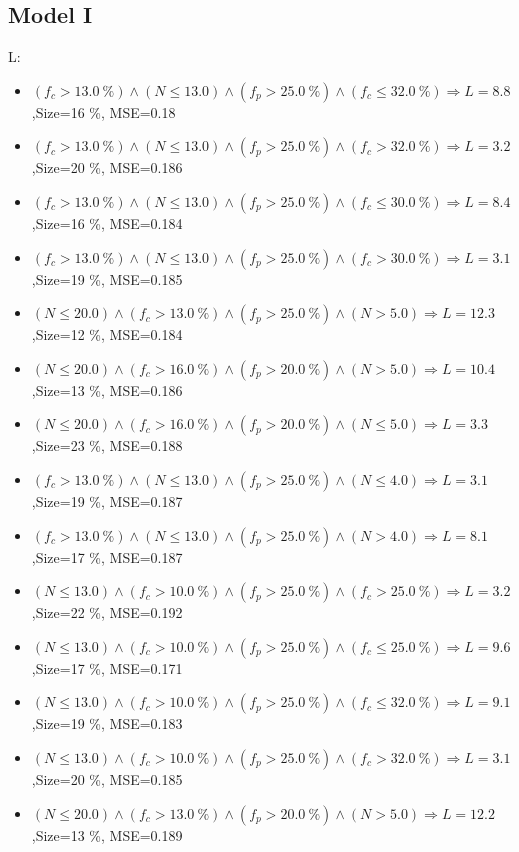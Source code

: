 \documentclass[numbered]{CSL}
\begin{document}
\subsection{Model I}
L:
\begin{itemize}
\item $(f_c > 13.0~\%) \land (N \leq 13.0) \land (f_p > 25.0~\%) \land (f_c \leq 32.0~\%) \Rightarrow L = 8.8$,\hfill Size=16 \%, MSE=0.18
\item $(f_c > 13.0~\%) \land (N \leq 13.0) \land (f_p > 25.0~\%) \land (f_c > 32.0~\%) \Rightarrow L = 3.2$,\hfill Size=20 \%, MSE=0.186
\item $(f_c > 13.0~\%) \land (N \leq 13.0) \land (f_p > 25.0~\%) \land (f_c \leq 30.0~\%) \Rightarrow L = 8.4$,\hfill Size=16 \%, MSE=0.184
\item $(f_c > 13.0~\%) \land (N \leq 13.0) \land (f_p > 25.0~\%) \land (f_c > 30.0~\%) \Rightarrow L = 3.1$,\hfill Size=19 \%, MSE=0.185
\item $(N \leq 20.0) \land (f_c > 13.0~\%) \land (f_p > 25.0~\%) \land (N > 5.0) \Rightarrow L = 12.3$,\hfill Size=12 \%, MSE=0.184
\item $(N \leq 20.0) \land (f_c > 16.0~\%) \land (f_p > 20.0~\%) \land (N > 5.0) \Rightarrow L = 10.4$,\hfill Size=13 \%, MSE=0.186
\item $(N \leq 20.0) \land (f_c > 16.0~\%) \land (f_p > 20.0~\%) \land (N \leq 5.0) \Rightarrow L = 3.3$,\hfill Size=23 \%, MSE=0.188
\item $(f_c > 13.0~\%) \land (N \leq 13.0) \land (f_p > 25.0~\%) \land (N \leq 4.0) \Rightarrow L = 3.1$,\hfill Size=19 \%, MSE=0.187
\item $(f_c > 13.0~\%) \land (N \leq 13.0) \land (f_p > 25.0~\%) \land (N > 4.0) \Rightarrow L = 8.1$,\hfill Size=17 \%, MSE=0.187
\item $(N \leq 13.0) \land (f_c > 10.0~\%) \land (f_p > 25.0~\%) \land (f_c > 25.0~\%) \Rightarrow L = 3.2$,\hfill Size=22 \%, MSE=0.192
\item $(N \leq 13.0) \land (f_c > 10.0~\%) \land (f_p > 25.0~\%) \land (f_c \leq 25.0~\%) \Rightarrow L = 9.6$,\hfill Size=17 \%, MSE=0.171
\item $(N \leq 13.0) \land (f_c > 10.0~\%) \land (f_p > 25.0~\%) \land (f_c \leq 32.0~\%) \Rightarrow L = 9.1$,\hfill Size=19 \%, MSE=0.183
\item $(N \leq 13.0) \land (f_c > 10.0~\%) \land (f_p > 25.0~\%) \land (f_c > 32.0~\%) \Rightarrow L = 3.1$,\hfill Size=20 \%, MSE=0.185
\item $(N \leq 20.0) \land (f_c > 13.0~\%) \land (f_p > 20.0~\%) \land (N > 5.0) \Rightarrow L = 12.2$,\hfill Size=13 \%, MSE=0.189

\end{itemize}
\end{document}
